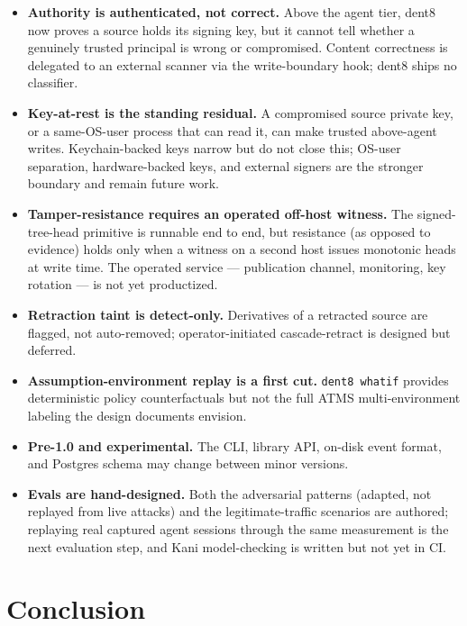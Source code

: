 \documentclass[11pt]{article}
\newcommand{\code}[1]{\texttt{#1}}
\begin{document}
\begin{itemize}[leftmargin=*]
  \item \textbf{Authority is authenticated, not correct.} Above the agent tier, dent8 now proves a source holds its signing key, but it cannot tell whether a genuinely trusted principal is wrong or compromised. Content correctness is delegated to an external scanner via the write-boundary hook; dent8 ships no classifier.
  \item \textbf{Key-at-rest is the standing residual.} A compromised source private key, or a same-OS-user process that can read it, can make trusted above-agent writes. Keychain-backed keys narrow but do not close this; OS-user separation, hardware-backed keys, and external signers are the stronger boundary and remain future work.
  \item \textbf{Tamper-resistance requires an operated off-host witness.} The signed-tree-head primitive is runnable end to end, but resistance (as opposed to evidence) holds only when a witness on a second host issues monotonic heads at write time. The operated service --- publication channel, monitoring, key rotation --- is not yet productized.
  \item \textbf{Retraction taint is detect-only.} Derivatives of a retracted source are flagged, not auto-removed; operator-initiated cascade-retract is designed but deferred.
  \item \textbf{Assumption-environment replay is a first cut.} \code{dent8 whatif} provides deterministic policy counterfactuals but not the full ATMS multi-environment labeling the design documents envision.
  \item \textbf{Pre-1.0 and experimental.} The CLI, library API, on-disk event format, and Postgres schema may change between minor versions.
  \item \textbf{Evals are hand-designed.} Both the adversarial patterns (adapted, not replayed from live attacks) and the legitimate-traffic scenarios are authored; replaying real captured agent sessions through the same measurement is the next evaluation step, and Kani model-checking is written but not yet in CI.
\end{itemize}

\section{Conclusion}
\end{document}
